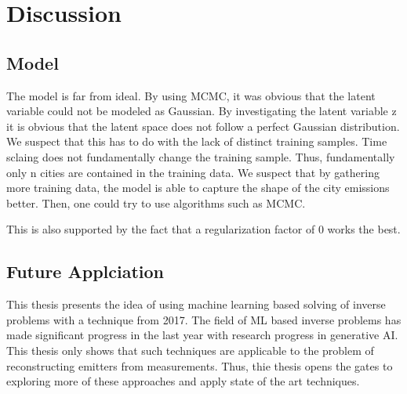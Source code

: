 
\chapter{Discussion}\label{chapter:discussion}

\section{Model}
The model is far from ideal.
By using MCMC, it was obvious that the latent variable could not be modeled as Gaussian.
By investigating the latent variable z it is obvious that the latent space does not follow a perfect Gaussian distribution.
We suspect that this has to do with the lack of distinct training samples.
Time sclaing does not fundamentally change the training sample.
Thus, fundamentally only n cities are contained in the training data.
We suspect that by gathering more training data, the model is able to capture the shape of the city emissions better.
Then, one could try to use algorithms such as MCMC.

This is also supported by the fact that a regularization factor of 0 works the best.

\section{Future Applciation}
This thesis presents the idea of using machine learning based solving of inverse problems with a technique from 2017.
The field of ML based inverse problems has made significant progress in the last year with research progress in generative AI.
This thesis only shows that such techniques are applicable to the problem of reconstructing emitters from measurements.
Thus, thie thesis opens the gates to exploring more of these approaches and apply state of the art techniques.
